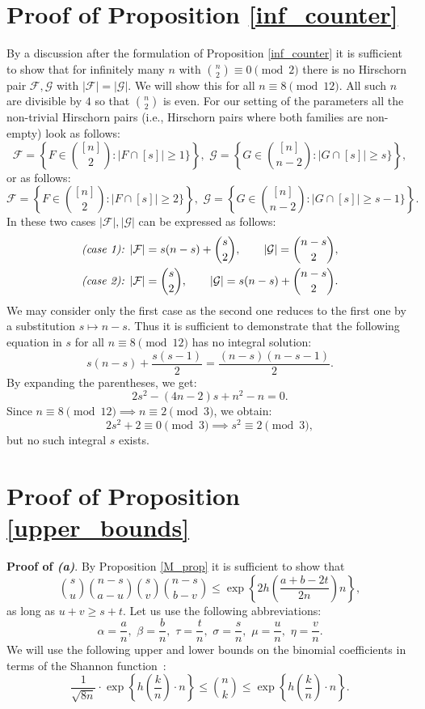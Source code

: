 \documentclass[12pt]{article}
\let\leq\leqslant
\let\geq\geqslant
\let\le\leq
\let\ge\geq
\def\F{{\mathcal F}}
\def\G{{\mathcal G}}
\begin{document}
\section{Proof of Proposition \ref{inf_counter}}
\label{sec:inf_counter}
By a discussion after the formulation of Proposition
  \ref{inf_counter} it is sufficient to show that for infinitely many
  $n$ with $\binom{n}{2}\equiv 0\pmod{2}$ there is no Hirschorn pair $\F,\G$ with $|\F| = |\G|$. We will show this for all 
 $n\equiv8\pmod{12}$. All such $n$ are divisible by $4$ so that $\binom{n}{2}$ is even.
For our setting of the parameters all the non-trivial Hirschorn pairs (i.e., Hirschorn pairs where both families are non-empty) look as follows:
$$
\F = \left\{F \in\binom{[n]}{2} : |F\cap [s]| \ge 1\}\right\}, \,\, \G = \left\{G \in\binom{[n]}{n - 2} : |G\cap [s]| \ge s\}\right\},$$
or as follows:
$$
\F = \left\{F \in\binom{[n]}{2} : |F\cap [s]| \ge 2\}\right\}, \,\, \G = \left\{G \in\binom{[n]}{n - 2} : |G\cap [s]| \ge s - 1\}\right\}.$$
In these two cases $|\F|, |\G|$ can be expressed as follows:
\begin{align*}
\mbox{\emph{(case 1):}  } |\F| &= s (n - s) + \binom{s}{2}, \qquad |\G| = \binom{n - s}{2}, \\
\mbox{\emph{(case 2):}  }|\F| &=  \binom{s}{2}, \qquad |\G| = s (n - s) + \binom{n - s}{2}. 
\end{align*}
We may consider only the first case as the second one reduces to the first one by a substitution $s\mapsto n - s$. Thus it is sufficient to demonstrate that the following equation in $s$ for all $n\equiv 8\pmod{12}$ has no integral solution:
$$s (n - s) + \frac{s(s - 1)}{2} = \frac{(n - s) (n - s - 1)}{2}.$$
By expanding the parentheses, we get:
$$2s^2 - (4n - 2) s + n^2 - n = 0.$$
Since  $n\equiv 8\pmod {12} \implies n\equiv 2\pmod{3}$,  we obtain:
$$2s^2 + 2  \equiv 0 \pmod{3} \implies s^2 \equiv 2\pmod{3},$$
but no such integral $s$ exists. 


\section{Proof of Proposition \ref{upper_bounds}}
\label{sec:upper_bounds}
\textbf{Proof of \emph{(a)}}. By Proposition \ref{M_prop} it is sufficient to show that 
$$\binom{s}{u} \binom{n - s}{a - u} \binom{s}{v} \binom{n - s}{b - v} \le \exp\left\{2h\left(\frac{a + b - 2t}{2n}\right)n\right\},$$
as long as $u + v \ge s + t$. Let us use the following abbreviations:
\begin{equation}
\label{abb}
\alpha = \frac{a}{n}, \,\, \beta = \frac{b}{n}, \,\, \tau = \frac{t}{n},\,\, \sigma = \frac{s}{n}, \,\, \mu = \frac{u}{n}, \,\, \eta = \frac{v}{n}.
\end{equation}
We will use the following upper and lower bounds on the binomial coefficients in terms of the Shannon function~\cite[Lemma 2.4.2]{cohen1997covering}:
\begin{equation}
\label{shannon}
 \frac{1}{\sqrt{8n}} \cdot  \exp\left\{h\left(\frac{k}{n}\right) \cdot n\right\}\le \binom{n}{k} \le \exp\left\{h\left(\frac{k}{n}\right) \cdot n\right\}.
\end{equation}
\end{document}
